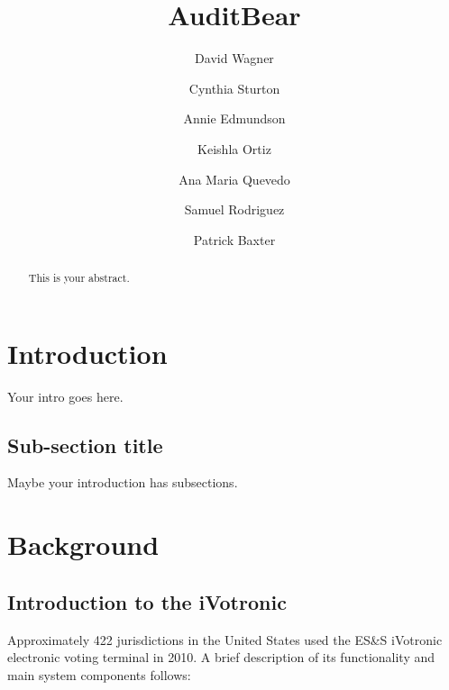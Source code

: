 \documentclass[letterpaper,twocolumn,10pt]{article}
\begin{document}
\title{AuditBear}
\author{David Wagner
\and Cynthia Sturton
\and Annie Edmundson
\and Keishla Ortiz
\and Ana Maria Quevedo
\and Samuel Rodriguez
\and Patrick Baxter}
\maketitle
\begin{abstract}
This is your abstract.
\end{abstract}

\section{Introduction}
Your intro goes here.

\subsection{Sub-section title}
Maybe your introduction has subsections.
\section{Background}

\subsection{Introduction to the iVotronic}
Approximately 422 jurisdictions in the United States used the ES\&S iVotronic electronic voting terminal in 2010.  A brief description of  its functionality and main system components follows:
\end{document}
